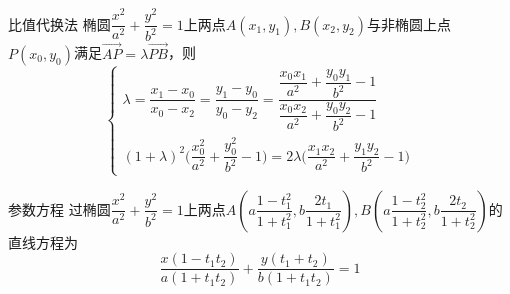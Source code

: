 \begin{conclusion}{比值代换法}{}
\noindent 椭圆$\dfrac{x^2}{a^2}+\dfrac{y^2}{b^2}=1$上两点$A(x_1,y_1),B(x_2,y_2)$与非椭圆上点$P(x_0,y_0)$满足$\overrightarrow{AP}=\lambda\overrightarrow{PB}$，则
\[\begin{cases}\lambda=\dfrac{x_1-x_0}{x_0-x_2}=\dfrac{y_1-y_0}{y_0-y_2}=\dfrac{\dfrac{x_0x_1}{a^2}+\dfrac{y_0y_1}{b^2}-1}{\dfrac{x_0x_2}{a^2}+\dfrac{y_0y_2}{b^2}-1}\\(1+\lambda)^2\bigg(\dfrac{x_0^2}{a^2}+\dfrac{y_0^2}{b^2}-1\bigg)=2\lambda\bigg(\dfrac{x_1x_2}{a^2}+\dfrac{y_1y_2}{b^2}-1\bigg)\end{cases}\]
\end{conclusion}
\begin{myproof}
\end{myproof}
\begin{conclusion}{参数方程}{}
    过椭圆$\dfrac{x^2}{a^2}+\dfrac{y^2}{b^2}=1$上两点$A\left(a\dfrac{1-t_1^2}{1+t_1^2},b\dfrac{2t_1}{1+t_1^2}\right),B\left(a\dfrac{1-t_2^2}{1+t_2^2},b\dfrac{2t_2}{1+t_2^2}\right)$的直线方程为\[\dfrac{x(1-t_1t_2)}{a(1+t_1t_2)}+\dfrac{y(t_1+t_2)}{b(1+t_1t_2)}=1\]
\end{conclusion}

